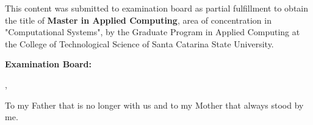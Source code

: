 % 
\begin{folhadeaprovacao}

	\begin{center}
		{\ABNTEXchapterfont\bfseries\imprimirautor}
		\vspace{6em}

			\ABNTEXchapterfont\bfseries\imprimirtitulo
		
	\end{center}
		\vspace{1em}
		{\justify
		This content was submitted to examination board as partial fulfillment to obtain the title of
    	{\ABNTEXchapterfont\bfseries Master in Applied Computing},   
   		area of concentration in "Computational Systems", by the Graduate Program in Applied Computing at the College of Technological Science of Santa Catarina State University.}


	\vspace{3em} 
	\noindent
	{\bfseries Examination Board:}

    \vspace*{\fill}
    \begin{center}
    	\imprimirlocal,\,\imprimirfulldata
    \end{center}
\end{folhadeaprovacao}

\begin{dedicatoria}				
To my Father that is no longer with us and to my Mother that always stood by me.
\end{dedicatoria}

